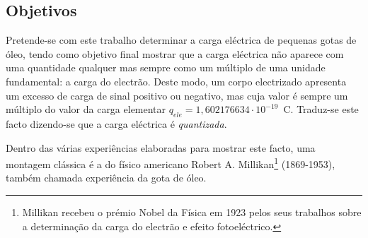 \begin{center}
\begin{minipage}[c][3cm][c]{\textwidth}
\begin{center}
\section*{\centering Objetivos}
    \vspace{-3mm}
\small
\justify
Pretende-se com este trabalho determinar a carga eléctrica de pequenas gotas de óleo, tendo como objetivo final mostrar que a carga eléctrica não aparece com uma quantidade qualquer mas sempre como um múltiplo de uma unidade fundamental: a carga do electrão. Deste modo, um corpo electrizado apresenta um excesso de carga de sinal positivo ou negativo, mas cuja valor é sempre um múltiplo do valor da carga elementar $q_{ele}= 1,602176634\cdot 10^{-19}\,$ C.
Traduz-se este facto dizendo-se que a carga eléctrica é \emph{quantizada}.

Dentro das várias experiências elaboradas para mostrar este facto, uma montagem clássica é a do físico americano Robert A. Millikan\footnote{Millikan recebeu o prémio Nobel da Física em 1923 pelos seus trabalhos sobre a determinação da carga do electrão e efeito fotoeléctrico.} (1869-1953), também chamada experiência da gota de óleo.
    
\end{center}
\hline


\end{minipage}
\begin{minipage}[c][2cm][c]{\textwidth}
\centering

\end{minipage}

\end{center}